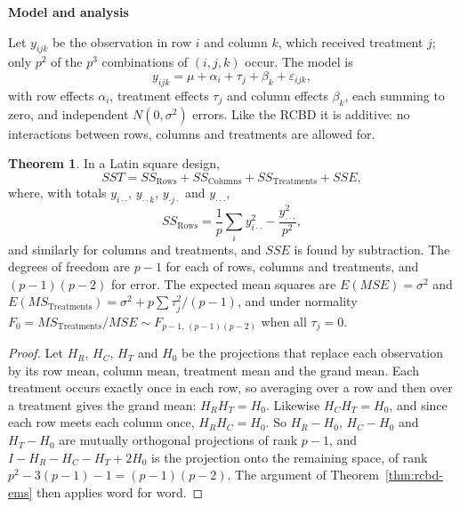 \documentclass[11pt,a4paper]{article}
\numberwithin{equation}{section}
\theoremstyle{definition}
\newtheorem{thm}{Theorem}[subsection]
\newcommand{\subhead}[1]{%
  \par\medskip\noindent\textbf{#1}\par\nobreak\smallskip}
\begin{document}
\subhead{Model and analysis}
Let $y_{ijk}$ be the observation in row $i$ and column $k$, which received treatment $j$; only $p^2$ of the $p^3$ combinations of $(i, j, k)$ occur. The model is
\[
y_{ijk} = \mu + \alpha_i + \tau_j + \beta_k + \varepsilon_{ijk} ,
\]
with row effects $\alpha_i$, treatment effects $\tau_j$ and column effects $\beta_k$, each summing to zero, and independent $N(0, \sigma^2)$ errors. Like the RCBD it is
additive: no interactions between rows, columns and treatments are allowed for.

\begin{thm}\label{thm:latin}
In a Latin square design,
\[
SST = SS_{\mathrm{Rows}} + SS_{\mathrm{Columns}} + SS_{\mathrm{Treatments}} + SSE ,
\]
where, with totals $y_{i\cdot\cdot}$, $y_{\cdot\cdot k}$, $y_{\cdot j\cdot}$ and $y_{\cdot\cdot\cdot}$,
\[
SS_{\mathrm{Rows}} = \frac1p\sum_iy_{i\cdot\cdot}^2 - \frac{y_{\cdot\cdot\cdot}^2}{p^2} ,
\]
and similarly for columns and treatments, and $SSE$ is found by subtraction. The degrees of freedom are $p - 1$ for each of rows, columns and
treatments, and $(p - 1)(p - 2)$ for error. The expected mean squares are $E(MSE) = \sigma^2$ and $E(MS_{\mathrm{Treatments}}) = \sigma^2 + p\sum\tau_j^2/(p - 1)$, and under normality
$F_0 = MS_{\mathrm{Treatments}}/MSE \sim F_{p-1,\,(p-1)(p-2)}$ when all $\tau_j = 0$.
\end{thm}

\begin{proof}
Let $H_R$, $H_C$, $H_T$ and $H_0$ be the projections that replace each observation by its row mean, column mean, treatment mean and the grand
mean. Each treatment occurs exactly once in each row, so averaging over a row and then over a treatment gives the grand mean: $H_RH_T = H_0$.
Likewise $H_CH_T = H_0$, and since each row meets each column once, $H_RH_C = H_0$. So $H_R - H_0$, $H_C - H_0$ and $H_T - H_0$ are mutually orthogonal
projections of rank $p - 1$, and $I - H_R - H_C - H_T + 2H_0$ is the projection onto the remaining space, of rank $p^2 - 3(p - 1) - 1 = (p - 1)(p - 2)$. The argument of
Theorem~\ref{thm:rcbd-ems} then applies word for word.
\end{proof}
\end{document}
